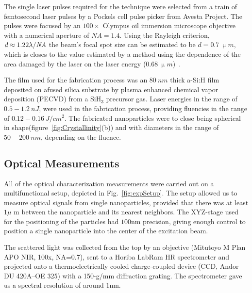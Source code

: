                 The single laser pulses required for the technique were selected from a train of femtosecond laser pulses by a Pockels cell
            pulse picker from Avesta Project. The pulses were focused by an $100\times$ Olympus oil immersion microscope objective with a
            numerical aperture of $\mathit{NA}=1.4$. Using the Rayleigh criterion, $\emph{d}\approx 1.22\lambda/\mathit{NA}$ the beam's focal
            spot size can be estimated to be $d=0.7~\si{\upmu m}$, which is closes to the value estimated by a method using the dependence
            of the area damaged by the laser on the laser energy ($0.68~\si{\upmu m}$)~\cite{liu1982simple}.

                The film used for the fabrication process was an $80~\si{nm}$ thick a-Si:H film deposited on afused silica substrate by
            plasma enhanced chemical vapor deposition (PECVD) from a SiH$_{3}$ precursor gas. Laser energies in the range of $0.5-1.2~\si{nJ}$, were used in the fabrication process, providing fluencies in
            the range of $0.12-0.16~\si{J/cm^{2}}$. The fabricated nanoparticles were to close being spherical in shape(figure~\ref{fig:Crystallinity}(b))
            and with diameters in the range of $50-200~\si{nm}$, depending on the fluence.

    \clearpage
    \subsection{Optical Measurements}
            All of the optical characterization measurements were carried out on a multifunctional setup, depicted in
            Fig.~\ref{fig:expSetup}. The setup allowed us to measure optical signals from single nanoparticles, provided that
            there was at least $1\mu$ m between the nanoparticle and its nearest neighbors. The XYZ-stage used for the
            positioning of the particles had $100$nm precision, giving enough control to position a single nanoparticle into
            the center of the excitation beam.

            The scattered light was collected from the top by an objective (Mitutoyo M Plan APO NIR, 100x, NA=0.7),
            sent to a Horiba LabRam HR spectrometer and projected onto a thermoelectrically cooled charge-coupled device
            (CCD, Andor DU 420A--OE 325) with a 150-g/mm diffraction grating. The spectrometer gave us a spectral resolution
            of around $1$nm.

